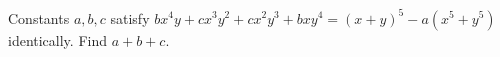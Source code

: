 Constants $a,b,c$ satisfy $bx^4y+cx^3y^2+cx^2y^3+bxy^4=(x+y)^5-a\left(x^5+y^5\right)$ identically. Find $a+b+c$.
